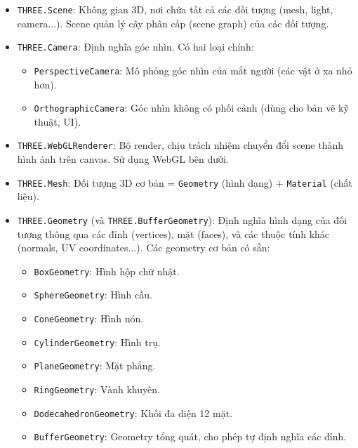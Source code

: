 \begin{itemize}
    \item \texttt{THREE.Scene}: Không gian 3D, nơi chứa tất cả các đối tượng (mesh, light, camera...). Scene quản lý cây phân cấp (scene graph) của các đối tượng.
    
    \item \texttt{THREE.Camera}: Định nghĩa góc nhìn. Có hai loại chính:
    \begin{itemize}
        \item \texttt{PerspectiveCamera}: Mô phỏng góc nhìn của mắt người (các vật ở xa nhỏ hơn).
        \item \texttt{OrthographicCamera}: Góc nhìn không có phối cảnh (dùng cho bản vẽ kỹ thuật, UI).
    \end{itemize}
    
    \item \texttt{THREE.WebGLRenderer}: Bộ render, chịu trách nhiệm chuyển đổi scene thành hình ảnh trên canvas. Sử dụng WebGL bên dưới.
    
    \item \texttt{THREE.Mesh}: Đối tượng 3D cơ bản = \texttt{Geometry} (hình dạng) + \texttt{Material} (chất liệu).
    
    \item \texttt{THREE.Geometry} (và \texttt{THREE.BufferGeometry}): Định nghĩa hình dạng của đối tượng thông qua các đỉnh (vertices), mặt (faces), và các thuộc tính khác (normals, UV coordinates...). Các geometry cơ bản có sẵn:
    \begin{itemize}
        \item \texttt{BoxGeometry}: Hình hộp chữ nhật.
        \item \texttt{SphereGeometry}: Hình cầu.
        \item \texttt{ConeGeometry}: Hình nón.
        \item \texttt{CylinderGeometry}: Hình trụ.
        \item \texttt{PlaneGeometry}: Mặt phẳng.
        \item \texttt{RingGeometry}: Vành khuyên.
        \item \texttt{DodecahedronGeometry}: Khối đa diện 12 mặt.
        \item \texttt{BufferGeometry}: Geometry tổng quát, cho phép tự định nghĩa các đỉnh.
    \end{itemize}
    

\end{itemize}

